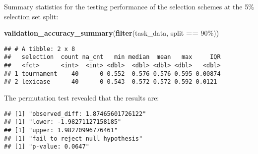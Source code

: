 \documentclass[
]{book}
\newenvironment{Shaded}{\begin{snugshade}}{\end{snugshade}}
\newcommand{\AttributeTok}[1]{\textcolor[rgb]{0.13,0.29,0.53}{#1}}
\newcommand{\DecValTok}[1]{\textcolor[rgb]{0.00,0.00,0.81}{#1}}
\newcommand{\FunctionTok}[1]{\textcolor[rgb]{0.13,0.29,0.53}{\textbf{#1}}}
\newcommand{\NormalTok}[1]{#1}
\newcommand{\OtherTok}[1]{\textcolor[rgb]{0.56,0.35,0.01}{#1}}
\newcommand{\SpecialCharTok}[1]{\textcolor[rgb]{0.81,0.36,0.00}{\textbf{#1}}}
\newcommand{\StringTok}[1]{\textcolor[rgb]{0.31,0.60,0.02}{#1}}
\begin{document}
Summary statistics for the testing performance of the selection schemes at the 5\% selection set split:

\begin{Shaded}
\begin{Highlighting}[]
\FunctionTok{validation\_accuracy\_summary}\NormalTok{(}\FunctionTok{filter}\NormalTok{(task\_data, split }\SpecialCharTok{==} \StringTok{\textquotesingle{}90\%\textquotesingle{}}\NormalTok{))}
\end{Highlighting}
\end{Shaded}

\begin{verbatim}
## # A tibble: 2 x 8
##   selection  count na_cnt   min median  mean   max     IQR
##   <fct>      <int>  <int> <dbl>  <dbl> <dbl> <dbl>   <dbl>
## 1 tournament    40      0 0.552  0.576 0.576 0.595 0.00874
## 2 lexicase      40      0 0.543  0.572 0.572 0.592 0.0121
\end{verbatim}

The permutation test revealed that the results are:

\begin{Shaded}
\end{Shaded}

\begin{verbatim}
## [1] "observed_diff: 1.87465601726122"
## [1] "lower: -1.98271127158185"
## [1] "upper: 1.98270996776461"
## [1] "fail to reject null hypothesis"
## [1] "p-value: 0.0647"
\end{verbatim}
\end{document}
